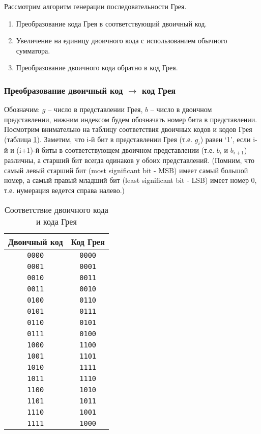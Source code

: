 Рассмотрим алгоритм генерации последовательности Грея.
\begin{enumerate} 
\item Преобразование кода Грея в соответствующий двоичный код.
\item Увеличение на единицу двоичного кода с использованием обычного сумматора.
\item Преобразование двоичного кода обратно в код Грея.
\end{enumerate}

\subsubsection{Преобразование двоичный код $\to$ код Грея}
Обозначим: $g$ – число в представлении Грея, $b$ – число в двоичном представлении, нижним индексом будем обозначать номер бита в представлении. Посмотрим внимательно на таблицу соответствия двоичных кодов и кодов Грея (таблица \ref{grey_code_table_1}). Заметим, что i-й бит в представлении Грея (т.е. $g_{i}$) равен ‘1’, если i-й и (i+1)-й биты в соответствующем двоичном представлении (т.е. $b_{i}$ и $b_{i+1}$) различны, а старший бит всегда одинаков у обоих представлений. (Помним, что самый левый старший бит (most significant bit - MSB) имеет самый большой номер, а самый правый младший бит (least significant bit - LSB) имеет номер 0, т.е. нумерация ведется справа налево.) 

\begin{table}[h]
\centering
\begin{tabular}{|c|c|}
\hline
Двоичный код       & Код Грея        \\ \hline
\texttt{0000} & \texttt{0000} \\
\texttt{0001} & \texttt{0001} \\
\texttt{0010} & \texttt{0011} \\
\texttt{0011} & \texttt{0010} \\
\texttt{0100} & \texttt{0110} \\
\texttt{0101} & \texttt{0111} \\
\texttt{0110} & \texttt{0101} \\
\texttt{0111} & \texttt{0100} \\
\texttt{1000} & \texttt{1100} \\
\texttt{1001} & \texttt{1101} \\
\texttt{1010} & \texttt{1111} \\
\texttt{1011} & \texttt{1110} \\
\texttt{1100} & \texttt{1010} \\
\texttt{1101} & \texttt{1011} \\
\texttt{1110} & \texttt{1001} \\
\texttt{1111} & \texttt{1000} \\

\hline
\end{tabular}\par
\caption{Соответствие двоичного кода и кода Грея}
\label{grey_code_table_1}
\end{table}


